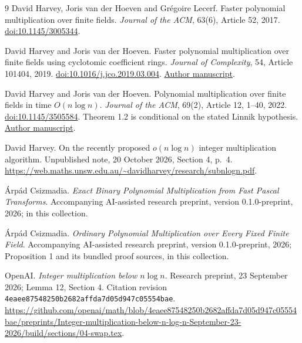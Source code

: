 \documentclass[11pt]{article}
\begin{document}
\begingroup
\small
\raggedright
\begin{thebibliography}{9}
David Harvey, Joris van der Hoeven and Gr\'egoire Lecerf.
\newblock Faster polynomial multiplication over finite fields.
\newblock \emph{Journal of the ACM}, 63(6), Article 52, 2017.
\newblock \href{https://doi.org/10.1145/3005344}{doi:10.1145/3005344}.

David Harvey and Joris van der Hoeven.
\newblock Faster polynomial multiplication over finite fields using
cyclotomic coefficient rings.
\newblock \emph{Journal of Complexity}, 54, Article 101404, 2019.
\newblock \href{https://doi.org/10.1016/j.jco.2019.03.004}{doi:10.1016/j.jco.2019.03.004}.
\newblock \href{https://www.texmacs.org/joris/cyclomult/cyclomult.pdf}{Author manuscript}.

David Harvey and Joris van der Hoeven.
\newblock Polynomial multiplication over finite fields in time $O(n\log n)$.
\newblock \emph{Journal of the ACM}, 69(2), Article 12, 1--40, 2022.
\newblock \href{https://doi.org/10.1145/3505584}{doi:10.1145/3505584}.
\newblock Theorem 1.2 is conditional on the stated Linnik hypothesis.
\href{https://www.texmacs.org/joris/ffnlogn/ffnlogn.pdf}{Author manuscript}.

David Harvey.
\newblock On the recently proposed $o(n\log n)$ integer multiplication algorithm.
\newblock Unpublished note, 20 October 2026, Section 4, p.~4.
\newblock \url{https://web.maths.unsw.edu.au/~davidharvey/research/subnlogn.pdf}.

\'Arp\'ad Csizmadia.
\newblock \emph{Exact Binary Polynomial Multiplication from Fast Pascal Transforms}.
\newblock Accompanying AI-assisted research preprint, version 0.1.0-preprint,
2026;  in this collection.

\'Arp\'ad Csizmadia.
\newblock \emph{Ordinary Polynomial Multiplication over Every Fixed Finite Field}.
\newblock Accompanying AI-assisted research preprint, version 0.1.0-preprint,
2026; Proposition 1 and its bundled proof sources,
 in this collection.

OpenAI.
\newblock \emph{Integer multiplication below $n\log n$}.
\newblock Research preprint, 23 September 2026; Lemma 12, Section 4.
\newblock Citation revision \texttt{4eaee87548250b2682affda7d05d947c05554bae}.
\newblock \url{https://github.com/openai/math/blob/4eaee87548250b2682affda7d05d947c05554bae/preprints/Integer-multiplication-below-n-log-n-September-23-2026/build/sections/04-swap.tex}.


\end{thebibliography}
\end{document}
